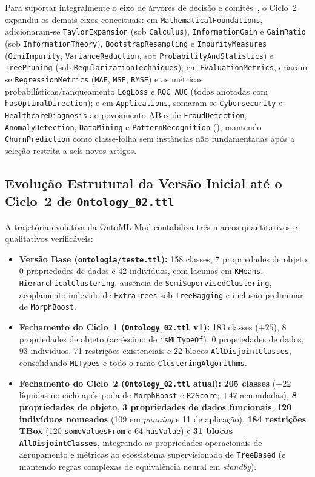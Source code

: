 \documentclass[11pt,a4paper]{article}
\newcommand{\onto}[1]{\texttt{#1}}
\begin{document}
Para suportar integralmente o eixo de árvores de decisão e comitês~\cite{breiman1984cart,quinlan1993c45,freund1997decision,breiman2001random,geurts2006extremely,bentejac2021comparative}, o Ciclo~2 expandiu os demais eixos conceituais: em \onto{MathematicalFoundations}, adicionaram-se \onto{TaylorExpansion} (sob \onto{Calculus}), \onto{InformationGain} e \onto{GainRatio} (sob \onto{InformationTheory}), \onto{BootstrapResampling} e \onto{ImpurityMeasures} (\onto{GiniImpurity}, \onto{VarianceReduction}, sob \onto{ProbabilityAndStatistics}) e \onto{TreePruning} (sob \onto{RegularizationTechniques}); em \onto{EvaluationMetrics}, criaram-se \onto{RegressionMetrics} (\onto{MAE}, \onto{MSE}, \onto{RMSE}) e as métricas probabilísticas/ranqueamento \onto{LogLoss} e \onto{ROC\_AUC} (todas anotadas com \onto{hasOptimalDirection}); e em \onto{Applications}, somaram-se \onto{Cybersecurity} e \onto{HealthcareDiagnosis} ao povoamento ABox de \onto{FraudDetection}, \onto{AnomalyDetection}, \onto{DataMining} e \onto{PatternRecognition} (\cite{sarker2021ml,bentejac2021comparative,elmassari2022diabetes}), mantendo \onto{ChurnPrediction} como classe-folha sem instâncias não fundamentadas após a seleção restrita a seis novos artigos.

\subsection{Evolução Estrutural da Versão Inicial até o Ciclo~2 de \texttt{Ontology\_02.ttl}}

A trajetória evolutiva da OntoML-Mod contabiliza três marcos quantitativos e qualitativos verificáveis:
\begin{itemize}[leftmargin=*,nosep]
  \item \textbf{Versão Base (\texttt{ontologia}/\texttt{teste.ttl}):} 158 classes, 7 propriedades de objeto, 0 propriedades de dados e 42 indivíduos, com lacunas em \onto{KMeans}, \onto{HierarchicalClustering}, ausência de \onto{SemiSupervisedClustering}, acoplamento indevido de \onto{ExtraTrees} sob \onto{TreeBagging} e inclusão preliminar de \onto{MorphBoost}.
  \item \textbf{Fechamento do Ciclo~1 (\texttt{Ontology\_02.ttl} v1):} 183 classes ($+25$), 8 propriedades de objeto (acréscimo de \onto{isMLTypeOf}), 0 propriedades de dados, 93 indivíduos, 71 restrições existenciais e 22 blocos \onto{AllDisjointClasses}, consolidando \onto{MLTypes} e todo o ramo \onto{ClusteringAlgorithms}.
  \item \textbf{Fechamento do Ciclo~2 (\texttt{Ontology\_02.ttl} atual):} \textbf{205 classes} ($+22$ líquidas no ciclo após poda de \onto{MorphBoost} e \onto{R2Score}; $+47$ acumuladas), \textbf{8 propriedades de objeto}, \textbf{3 propriedades de dados funcionais}, \textbf{120 indivíduos nomeados} (109 em \emph{punning} e 11 de aplicação), \textbf{184 restrições TBox} (120 \onto{someValuesFrom} e 64 \onto{hasValue}) e \textbf{31 blocos \onto{AllDisjointClasses}}, integrando as propriedades operacionais de agrupamento e métricas ao ecossistema supervisionado de \onto{TreeBased} (e mantendo regras complexas de equivalência neural em \emph{standby}).
\end{itemize}
\end{document}
